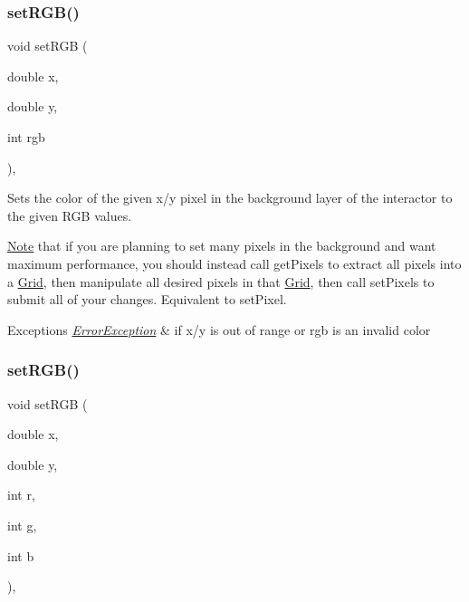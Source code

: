 \subsubsection{\texorpdfstring{set\+R\+G\+B()}{setRGB()}\hspace{0.1cm}{\footnotesize\ttfamily [1/3]}}
{\footnotesize\ttfamily void set\+R\+GB (\begin{DoxyParamCaption}\item[{double}]{x,  }\item[{double}]{y,  }\item[{int}]{rgb }\end{DoxyParamCaption})\hspace{0.3cm}{\ttfamily [virtual]}, {\ttfamily [inherited]}}



Sets the color of the given x/y pixel in the background layer of the interactor to the given R\+GB values. 

\mbox{\hyperlink{classNote}{Note}} that if you are planning to set many pixels in the background and want maximum performance, you should instead call get\+Pixels to extract all pixels into a \mbox{\hyperlink{classGrid}{Grid}}, then manipulate all desired pixels in that \mbox{\hyperlink{classGrid}{Grid}}, then call set\+Pixels to submit all of your changes. Equivalent to set\+Pixel.


\begin{DoxyExceptions}{Exceptions}
{\em \mbox{\hyperlink{classErrorException}{Error\+Exception}}} & if x/y is out of range or rgb is an invalid color \\
\hline
\end{DoxyExceptions}
\mbox{\label{classGDrawingSurface_a81202471d4fc9f2015aef0bc073acfab}} 
\subsubsection{\texorpdfstring{set\+R\+G\+B()}{setRGB()}\hspace{0.1cm}{\footnotesize\ttfamily [2/3]}}
{\footnotesize\ttfamily void set\+R\+GB (\begin{DoxyParamCaption}\item[{double}]{x,  }\item[{double}]{y,  }\item[{int}]{r,  }\item[{int}]{g,  }\item[{int}]{b }\end{DoxyParamCaption})\hspace{0.3cm}{\ttfamily [virtual]}, {\ttfamily [inherited]}}



